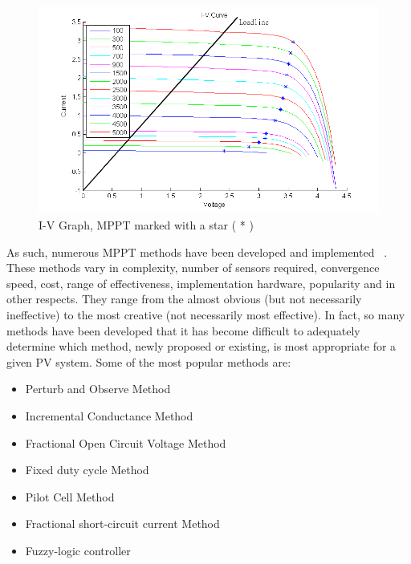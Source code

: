  \begin{figure}[H]
   \begin{center}
     \includegraphics[width=\textwidth]{images/IV_lux_MPP}
     \caption{I-V Graph, MPPT marked with a star ( * )}
     \label{fig:IV_mppgraph}
    \end{center}
  \end{figure}

As such, numerous \ac{MPPT} methods have been developed and implemented ~\cite{dondi2008modeling}\cite{eltawil2013mppt}\cite{ngan2011study}\cite{reza2013classification}. These methods vary in complexity, number of sensors required, convergence speed, cost, range of effectiveness, implementation hardware, popularity and in other respects. They range from the almost obvious (but not necessarily ineffective) to the most creative (not necessarily most effective)\cite{esram2007comparison}. In fact, so many methods have been developed that it has become difficult to adequately determine which method, newly proposed or existing, is most appropriate for a given PV system. Some of the most popular methods are: \\

  
\begin{itemize}
 \item Perturb and Observe Method
 \item Incremental Conductance Method
 \item Fractional Open Circuit Voltage Method
 \item Fixed duty cycle Method
 \item Pilot Cell Method
 \item Fractional short-circuit current Method
 \item Fuzzy-logic controller
\end {itemize}
 
